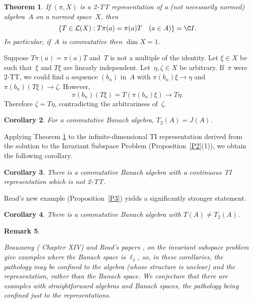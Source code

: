 \documentclass[11pt]{article}
\newtheorem{thm}{Theorem}[section]
\newtheorem{cor}[thm]{Corollary}
\newenvironment{Proof}{{\it Proof. }}{}%
\newtheorem{remk}[thm]{Remark}
\newenvironment{Remark}{\begin{remk}\begin{rm}}{\end{rm}\end{remk}}
\newcommand{\LX}{{\cal L}(X)}
\begin{document}
\begin{thm}\label{T1}
If $(\pi,X)$ is a 2-TT representation of a (not
necessarily normed) algebra~$A$ on a normed space~$X$, then
$$\{T \in \LX: T\pi(a) = \pi(a)T\quad(a \in A)\} = \C I.$$
In particular, if~$A$ is commutative then $\dim X = 1$.
\end{thm}

\begin{Proof}
Suppose $T\pi(a) = \pi(a)T$ and~$T$ is not a multiple of the identity.
Let $\xi \in X$ be such that~$\xi$
and $T\xi$ are linearly independent.    Let~$\eta,\zeta \in X$ be
arbitrary.    If~$\pi$ were 2-TT, we could find a sequence
$(b_n)$ in~$A$ with $\pi(b_n)\xi \to \eta$ and $\pi(b_n)(T\xi) \to \zeta$.
However,
$$\pi(b_n)(T\xi) = T(\pi(b_n)\xi) \to T\eta.$$
Therefore $\zeta = T\eta$, contradicting the arbitrariness of~$\zeta$.
\end{Proof}

\begin{cor}\label{C2b}
For a commutative Banach algebra, $T_2(A) = J(A)$.
\end{cor}

Applying Theorem \ref{T1} to the infinite-dimensional TI representation derived
from the solution to the Invariant Subspace Problem (Proposition~\ref{P2}(1)),
we obtain the following corollary.

\begin{cor}\label{C2}
There is a commutative Banach algebra with a continuous TI representation
which is not 2-TT.
\end{cor}

Read's new example (Proposition~\ref{P3}) yields a significantly stronger
statement.

\begin{cor}\label{C2a}
There is a commutative Banach algebra with $T(A) \ne T_2(A)$.
\end{cor}

\begin{Remark}
Beauzamy (\cite{Beauzamy} Chapter XIV) and Read's papers \cite{Readl1},
\cite{Readqn} on the invariant subspace problem give examples where the Banach
space is $\ell_1$, so, in these corollaries, the pathology may be confined to
the algebra (whose structure is unclear) and the representation, rather than the
Banach space.   We conjecture that there are examples with straightforward
algebras and Banach spaces, the pathology being confined just to the
representations.
\end{Remark}
\end{document}
